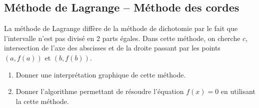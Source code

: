 \documentclass[10pt]{article}
\begin{document}
\subsection{Méthode de Lagrange -- Méthode des cordes}

La méthode de Lagrange diffère de la méthode de dichotomie par le fait que l'intervalle n'est pas divisé en 2 parts égales. Dans cette méthode, on cherche $c$, intersection de l'axe des abscisses et de la droite passant par les points $(a,f(a))$ et $(b,f(b))$.

\begin{enumerate}
\item Donner une interprétation graphique de cette méthode.
\item Donner l'algorithme permettant de résoudre l'équation $f(x)=0$ en utilisant la cette méthode.
\end{enumerate}
\end{document}
